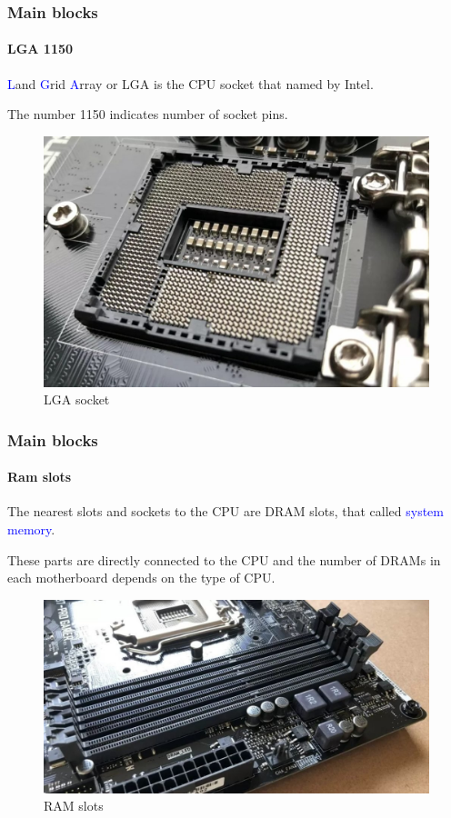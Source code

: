 \documentclass[
	12pt, %
]{beamer}
\begin{document}
\begin{frame}
	\frametitle{Main blocks}
	\framesubtitle{LGA 1150}
	
	\textcolor{blue}{L}and \textcolor{blue}{G}rid \textcolor{blue}{A}rray or LGA is the CPU socket that named by Intel.
	
	The number 1150 indicates number of socket pins.
	
	\begin{figure}
		\centering
		\includegraphics[width=0.65\linewidth]{Images/img4.jpg}
		\caption{LGA socket}
		\label{LGA socket}
	\end{figure}
\end{frame}






\begin{frame}
	\frametitle{Main blocks}
	\framesubtitle{Ram slots}
	
	The nearest slots and sockets to the CPU are DRAM slots, that called \textcolor{blue}{system memory}.
	
	These parts are directly connected to the CPU and the number of DRAMs in each motherboard depends on the type of CPU.
	
	\begin{figure}
		\centering
		\includegraphics[width=0.7\linewidth]{Images/img5.jpg}
		\caption{RAM slots}
		\label{RAM slots}
	\end{figure}
\end{frame}
\end{document}
